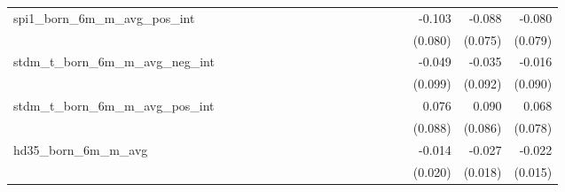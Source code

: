 \begin{tabular}{lrrrrrrrrrrrrrrrrrr}
spi1\_born\_6m\_m\_avg\_pos\_int            &             &             &             &             &             &             &             &             &             &             &             &             &             &             &             &      -0.103 &      -0.088 &      -0.080 \\ 
                                            &             &             &             &             &             &             &             &             &             &             &             &             &             &             &             &     (0.080) &     (0.075) &     (0.079) \\ 
stdm\_t\_born\_6m\_m\_avg\_neg\_int         &             &             &             &             &             &             &             &             &             &             &             &             &             &             &             &      -0.049 &      -0.035 &      -0.016 \\ 
                                            &             &             &             &             &             &             &             &             &             &             &             &             &             &             &             &     (0.099) &     (0.092) &     (0.090) \\ 
stdm\_t\_born\_6m\_m\_avg\_pos\_int         &             &             &             &             &             &             &             &             &             &             &             &             &             &             &             &       0.076 &       0.090 &       0.068 \\ 
                                            &             &             &             &             &             &             &             &             &             &             &             &             &             &             &             &     (0.088) &     (0.086) &     (0.078) \\ 
hd35\_born\_6m\_m\_avg                      &             &             &             &             &             &             &             &             &             &             &             &             &             &             &             &      -0.014 &      -0.027 &      -0.022 \\ 
                                            &             &             &             &             &             &             &             &             &             &             &             &             &             &             &             &     (0.020) &     (0.018) &     (0.015) \\ 

\end{tabular}

